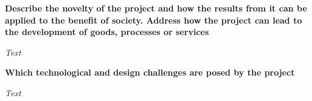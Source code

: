 
\noindent
\textbf{Describe the novelty of the project and how the results from it can be applied to the benefit of society. Address how the project can lead to the development of goods, processes or services}

\noindent
\textit{Text}

\noindent
\textbf{Which technological and design challenges are posed by the project}

\noindent
\textit{Text}